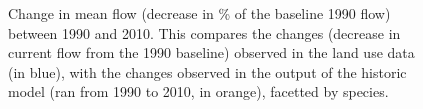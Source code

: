 

\begin{figure}[h!]
 \caption[Change in mean flow (in \% of the 1990 flow) between 1990 and 2010, comparing the historic model run (1990-2010) with observations] {Change in mean flow (decrease in \% of the baseline 1990 flow) between 1990 and 2010. This compares the changes (decrease in current flow from the 1990 baseline) observed in the land use data (in blue), with the changes observed in the output of the historic model (ran from 1990 to 2010, in orange), facetted by species.}
 \label{fig:flow_historic}
\end{figure}


